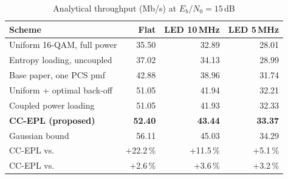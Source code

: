 \begin{table}[t]\centering\footnotesize
\caption{Analytical throughput (Mb/s) at $E_b/N_0=15$\,dB}\label{tab:main}
\begin{tabular}{@{}lrrr@{}}\toprule
Scheme & Flat & LED 10\,MHz & LED 5\,MHz \\\midrule
Uniform 16-QAM, full power & 35.50 & 32.89 & 28.01 \\
Entropy loading, uncoupled & 37.02 & 34.13 & 28.99 \\
Base paper, one PCS pmf~\cite{pham2026} & 42.88 & 38.96 & 31.74 \\
Uniform + optimal back-off & 51.05 & 41.94 & 32.21 \\
Coupled power loading~\cite{ling2020} & 51.05 & 41.93 & 32.33 \\
\textbf{CC-EPL (proposed)} & \textbf{52.40} & \textbf{43.44} & \textbf{33.37} \\
Gaussian bound & 56.11 & 45.03 & 34.29 \\
\midrule
CC-EPL vs.~\cite{pham2026} & +22.2\,\% & +11.5\,\% & +5.1\,\% \\
CC-EPL vs.~\cite{ling2020} & +2.6\,\% & +3.6\,\% & +3.2\,\% \\
\bottomrule\end{tabular}\end{table}
